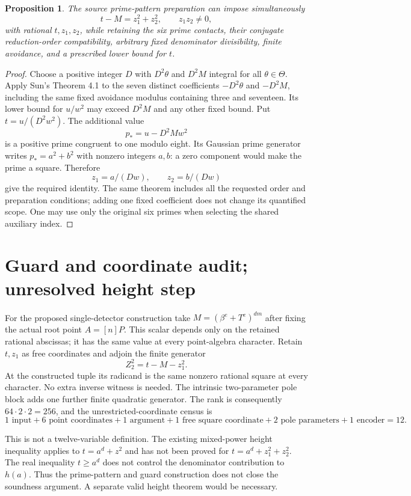 \documentclass[11pt,a4paper]{article}
\newtheorem{proposition}{Proposition}
\begin{document}
\begin{proposition}
The source prime-pattern preparation can impose simultaneously
\[
                 t-M=z_1^2+z_2^2,\qquad z_1z_2\ne0,
\]
with rational $t,z_1,z_2$, while retaining the six prime contacts,
their conjugate reduction-order compatibility, arbitrary fixed
denominator divisibility, finite avoidance, and a prescribed lower
bound for $t$.
\end{proposition}
\begin{proof}
Choose a positive integer $D$ with $D^2\theta$ and $D^2M$ integral
for all $\theta\in\Theta$. Apply Sun's Theorem 4.1 to the seven
distinct coefficients $-D^2\theta$ and $-D^2M$, including the
same fixed avoidance modulus containing three and seventeen.
Its lower bound for $u/w^2$ may exceed $D^2M$ and any other
fixed bound. Put $t=u/(D^2w^2)$.
The additional value
\[
                     p_*=u-D^2Mw^2
\]
is a positive prime congruent to one modulo eight. Its Gaussian
prime generator writes $p_*=a^2+b^2$ with nonzero integers $a,b$:
a zero component would make the prime a square. Therefore
\[
                  z_1=a/(Dw),\qquad z_2=b/(Dw)
\]
give the required identity. The same theorem includes all the
requested order and preparation conditions; adding one fixed
coefficient does not change its quantified scope. One may use only
the original six primes when selecting the shared auxiliary index.
\end{proof}

\section*{Guard and coordinate audit; unresolved height step}
For the proposed single-detector construction take
$M=(\beta^e+T^e)^{dm}$ after fixing the actual root point $A=[n]P$.
This scalar depends only on the retained rational abscissas; it has
the same value at every point-algebra character. Retain $t,z_1$ as
free coordinates and adjoin the finite generator
\[
                    Z_2^2=t-M-z_1^2.
\]
At the constructed tuple its radicand is the same nonzero rational
square at every character. No extra inverse witness is needed.
The intrinsic two-parameter pole block adds one further finite
quadratic generator. The rank is consequently $64\cdot2\cdot2=256$,
and the unrestricted-coordinate census is
\[
  1\text{ input}+6\text{ point coordinates}+1\text{ argument}
  +1\text{ free square coordinate}+2\text{ pole parameters}
  +1\text{ encoder}=12.
\]

This is not a twelve-variable definition. The existing mixed-power
height inequality applies to $t=a^d+z^2$ and has not been proved
for $t=a^d+z_1^2+z_2^2$. The real inequality $t\ge a^d$ does
not control the denominator contribution to $h(a)$. Thus the
prime-pattern and guard construction does not close the soundness
argument. A separate valid height theorem would be necessary.
\end{document}
